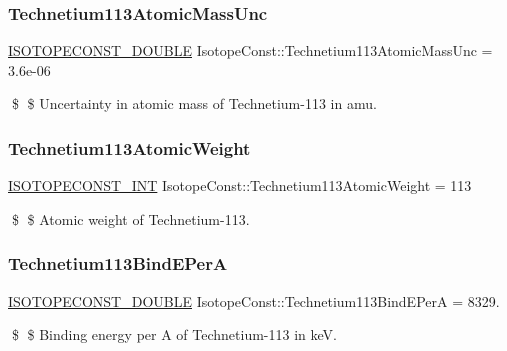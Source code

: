 \subsubsection{\texorpdfstring{Technetium113\+Atomic\+Mass\+Unc}{Technetium113AtomicMassUnc}}
{\footnotesize\ttfamily \mbox{\hyperlink{group___isotope_const-_macros_ga8f45a7272ce02c0b4c65c44636ed719a}{I\+S\+O\+T\+O\+P\+E\+C\+O\+N\+S\+T\+\_\+\+D\+O\+U\+B\+LE}} Isotope\+Const\+::\+Technetium113\+Atomic\+Mass\+Unc = 3.\+6e-\/06}

\$ \$ Uncertainty in atomic mass of Technetium-\/113 in amu. \mbox{\label{group___isotope_const-_technetium-_tc113_ga31d7cc037b22c854d5db130d2cef5a71}} 
\subsubsection{\texorpdfstring{Technetium113\+Atomic\+Weight}{Technetium113AtomicWeight}}
{\footnotesize\ttfamily \mbox{\hyperlink{group___isotope_const-_macros_ga5f18360b3e99483a35c32d789e62621c}{I\+S\+O\+T\+O\+P\+E\+C\+O\+N\+S\+T\+\_\+\+I\+NT}} Isotope\+Const\+::\+Technetium113\+Atomic\+Weight = 113}

\$ \$ Atomic weight of Technetium-\/113. \mbox{\label{group___isotope_const-_technetium-_tc113_ga2476db9aa951088ccbc2cc86fdbce0d8}} 
\subsubsection{\texorpdfstring{Technetium113\+Bind\+E\+PerA}{Technetium113BindEPerA}}
{\footnotesize\ttfamily \mbox{\hyperlink{group___isotope_const-_macros_ga8f45a7272ce02c0b4c65c44636ed719a}{I\+S\+O\+T\+O\+P\+E\+C\+O\+N\+S\+T\+\_\+\+D\+O\+U\+B\+LE}} Isotope\+Const\+::\+Technetium113\+Bind\+E\+PerA = 8329.}

\$ \$ Binding energy per A of Technetium-\/113 in keV. \mbox{\label{group___isotope_const-_technetium-_tc113_gab89d995889be531af7d6c3fbe99bd4ac}} 
